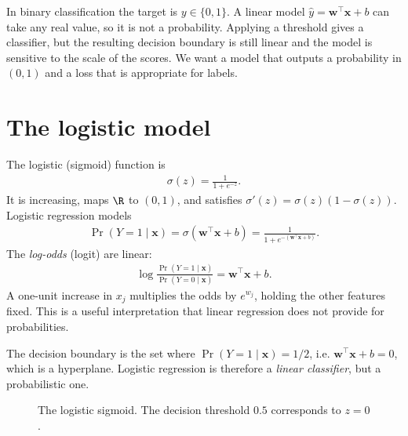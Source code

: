 \documentclass[a4paper, 12pt]{book}
\begin{document}
In binary classification the target is $y \in \{0,1\}$. A linear model
$\hat{y} = \mathbf{w}^\top\mathbf{x} + b$ can take any real value, so it is not a
probability. Applying a threshold gives a classifier, but the resulting decision
boundary is still linear and the model is sensitive to the scale of the scores. We
want a model that outputs a probability in $(0,1)$ and a loss that is appropriate for
labels.

\section{The logistic model}

The logistic (sigmoid) function is
\begin{align}
    \sigma(z) = \frac{1}{1+e^{-z}}.
\end{align}
It is increasing, maps $\R$ to $(0,1)$, and satisfies
$\sigma'(z)=\sigma(z)(1-\sigma(z))$. Logistic regression models
\begin{align}
    \Pr(Y=1\mid\mathbf{x}) = \sigma(\mathbf{w}^\top\mathbf{x} + b)
    = \frac{1}{1+e^{-(\mathbf{w}^\top\mathbf{x}+b)}}.
\end{align}
The \emph{log-odds} (logit) are linear:
\begin{align}
    \log\frac{\Pr(Y=1\mid\mathbf{x})}{\Pr(Y=0\mid\mathbf{x})}
    = \mathbf{w}^\top\mathbf{x} + b.
\end{align}
A one-unit increase in $x_j$ multiplies the odds by $e^{w_j}$, holding the other
features fixed. This is a useful interpretation that linear regression does not
provide for probabilities.

The decision boundary is the set where $\Pr(Y=1\mid\mathbf{x})=1/2$, i.e.
$\mathbf{w}^\top\mathbf{x}+b=0$, which is a hyperplane. Logistic regression is
therefore a \emph{linear classifier}, but a probabilistic one.

\begin{figure}[htbp]
\centering
{}
\caption{The logistic sigmoid. The decision threshold $0.5$ corresponds to $z=0$.}
\label{fig:sigmoid}
\end{figure}
\end{document}
